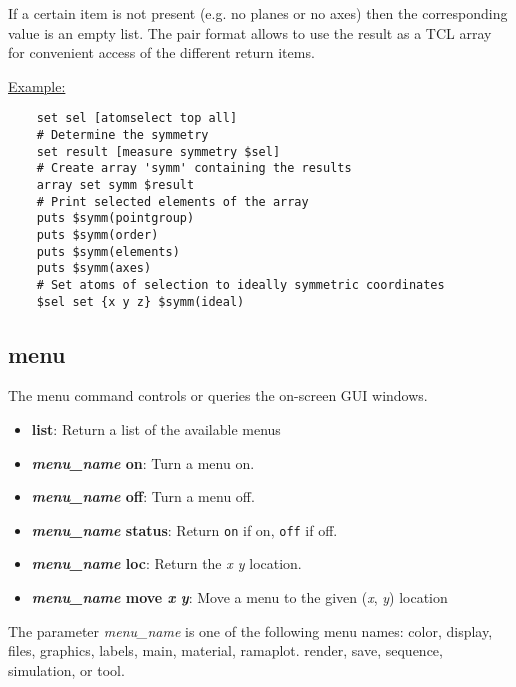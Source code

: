 \begin{itemize}
  If a certain item is not present (e.g. no planes or no axes)
  then the corresponding value is an empty list.
  The pair format allows to use the result as a TCL array for
  convenient access of the different return items.

  \underline{Example:}
  \begin{verbatim}
    set sel [atomselect top all]
    # Determine the symmetry
    set result [measure symmetry $sel]
    # Create array 'symm' containing the results
    array set symm $result
    # Print selected elements of the array
    puts $symm(pointgroup)
    puts $symm(order)
    puts $symm(elements)
    puts $symm(axes)
    # Set atoms of selection to ideally symmetric coordinates
    $sel set {x y z} $symm(ideal)
  \end{verbatim}
  

\end{itemize}


\subsection{menu}
\label{ug:ui:text:menu}
The menu command controls or queries the on-screen GUI windows.

  \begin{itemize}
    \item {\bf  list}: Return a list of the available menus
    \item {\bf  {\it menu\_name} on}: Turn a menu on.
    \item {\bf  {\it menu\_name} off}: Turn a menu off.
    \item {\bf  {\it menu\_name} status}: Return {\tt on} if on, {\tt off} if off.
    \item {\bf  {\it menu\_name} loc}: Return the {\it x y} location.
    \item {\bf  {\it menu\_name} move {\it x} {\it y}}: Move a menu to the 
	given ({\it x}, {\it y}) location
  \end{itemize}

\noindent The parameter {\it menu\_name} is one of the following menu names:
color, 
display, 
files, 
graphics, 
labels, 
main, 
material, 
ramaplot. 
render, 
save, 
sequence, 
simulation, 
or tool. 

